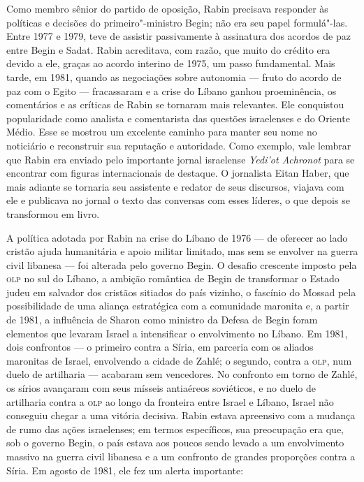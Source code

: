 Como membro sênior do partido de oposição, Rabin precisava responder às
políticas e decisões do primeiro"-ministro Begin; não era seu papel
formulá"-las. Entre 1977 e 1979, teve de assistir passivamente à
assinatura dos acordos de paz entre Begin e Sadat. Rabin acreditava, com
razão, que muito do crédito era devido a ele, graças ao acordo interino
de 1975, um passo fundamental. Mais tarde, em 1981, quando as
negociações sobre autonomia --- fruto do acordo de paz com o Egito ---
fracassaram e a crise do Líbano ganhou proeminência, os comentários e as
críticas de Rabin se tornaram mais relevantes. Ele conquistou
popularidade como analista e comentarista das questões israelenses e do
Oriente Médio. Esse se mostrou um excelente caminho para manter seu nome
no noticiário e reconstruir sua reputação e autoridade. Como exemplo,
vale lembrar que Rabin era enviado pelo importante jornal israelense
\emph{Yedi'ot Achronot} para se encontrar com figuras internacionais de
destaque. O jornalista Eitan Haber, que mais adiante se tornaria seu
assistente e redator de seus discursos, viajava com ele e publicava no
jornal o texto das conversas com esses líderes, o que depois se
transformou em livro.

A política adotada por Rabin na crise do Líbano de 1976
--- de oferecer ao lado cristão ajuda humanitária e apoio militar
limitado, mas sem se envolver na guerra civil libanesa --- foi alterada
pelo governo Begin. O desafio crescente imposto pela \textsc{olp} no sul do
Líbano, a ambição romântica de Begin de transformar o Estado judeu em
salvador dos cristãos sitiados do país vizinho, o fascínio do Mossad
pela possibilidade de uma aliança estratégica com a comunidade maronita
e, a partir de 1981, a influência de Sharon como ministro da Defesa de
Begin foram elementos que levaram Israel a intensificar o envolvimento
no Líbano. Em 1981, dois confrontos --- o primeiro contra a Síria, em
parceria com os aliados maronitas de Israel, envolvendo a cidade de
Zahlé; o segundo, contra a \textsc{olp}, num duelo de artilharia --- acabaram sem
vencedores. No confronto em torno de Zahlé, os sírios avançaram com seus
mísseis antiaéreos soviéticos, e no duelo de artilharia contra a \textsc{olp} ao
longo da fronteira entre Israel e Líbano, Israel não conseguiu chegar a
uma vitória decisiva. Rabin estava apreensivo com a mudança de rumo das
ações israelenses; em termos específicos, sua preocupação era que, sob o
governo Begin, o país estava aos poucos sendo levado a um envolvimento
massivo na guerra civil libanesa e a um confronto de grandes proporções
contra a Síria. Em agosto de 1981, ele fez um alerta importante:

